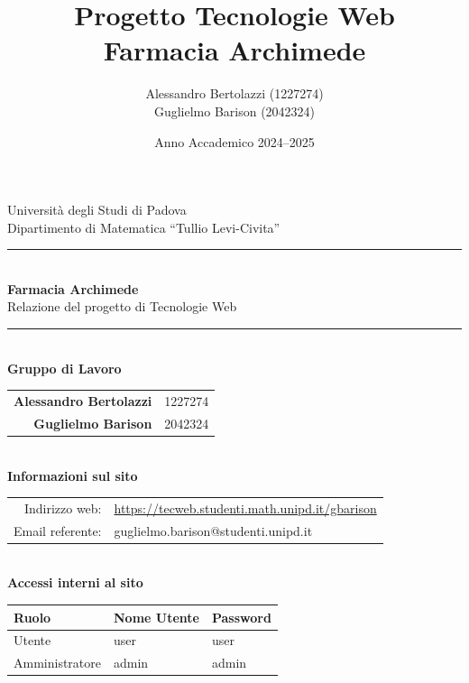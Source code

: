 \documentclass[a4paper, 11pt]{article}
\title{%
    \Huge{\textbf{Progetto Tecnologie Web}}\\[6pt]
    \Large{Farmacia Archimede}
}
\author{%
    Alessandro Bertolazzi (1227274) \\ 
    Guglielmo Barison (2042324)
}
\date{Anno Accademico 2024--2025}
\begin{document}
\begin{titlepage}
    \begin{center}
        \vspace*{1cm}
        
        
        {\Large Università degli Studi di Padova}\\
        {\large Dipartimento di Matematica ``Tullio Levi-Civita''}\\[2cm]
        
        \rule{\textwidth}{1pt}\\[0.5cm]
        {\Huge \textbf{Farmacia Archimede}}\\[0.3cm]
        {\LARGE Relazione del progetto di Tecnologie Web}\\[0.5cm]
        \rule{\textwidth}{1pt}\\[2cm]
        
        {\Large \textbf{Gruppo di Lavoro}}\\[0.3cm]
        \begin{tabular}{rl}
            \textbf{Alessandro Bertolazzi} & 1227274 \\
            \textbf{Guglielmo Barison}     & 2042324 \\
        \end{tabular}\\[2cm]
        
        {\Large \textbf{Informazioni sul sito}}\\[0.8cm]
        \begin{tabular}{rl}
            Indirizzo web:  & \url{https://tecweb.studenti.math.unipd.it/gbarison} \\
            Email referente: & guglielmo.barison@studenti.unipd.it \\
        \end{tabular}\\[2cm]
        
        {\Large \textbf{Accessi interni al sito}}\\[0.8cm]
        \begin{tabular}{|l|l|l|}
            \hline
            \rowcolor[HTML]{9B0014}
            {\color[HTML]{FFFFFF} Ruolo} & {\color[HTML]{FFFFFF} Nome Utente} & {\color[HTML]{FFFFFF} Password} \\ \hline
            Utente         & user  & user  \\ \hline
            Amministratore & admin & admin \\ \hline
        \end{tabular}\\[3cm]
    \end{center}
\end{titlepage}
\end{document}
